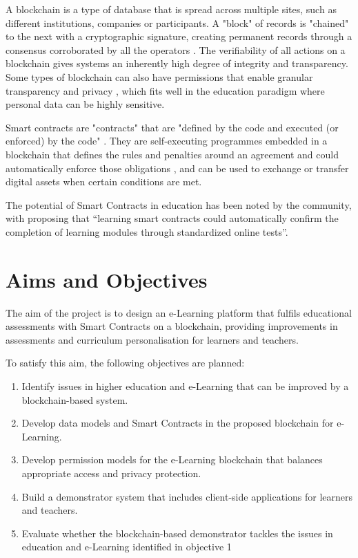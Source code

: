 A blockchain is a type of database that is spread across multiple sites, such as different institutions, companies
or participants. A "block" of records is "chained" to the next with a cryptographic signature, creating permanent records
through a consensus corroborated by all the operators \citep[p.17]{walport2016distributed}.
The verifiability of all actions on a blockchain gives systems an inherently high degree of integrity and transparency.
Some types of blockchain can also have permissions that enable granular transparency and privacy \citep[p.22]{walport2016distributed},
which fits well in the education paradigm where personal data can be highly sensitive.

Smart contracts are "contracts" that are "defined by the code and executed (or enforced) by the code" \citep[p.16]{swan2015blockchain}.
They are self-executing programmes embedded in a blockchain that defines the rules and penalties around an agreement and could automatically enforce
those obligations \citep{gulhane2017ibm}, and can be used to exchange or transfer digital assets when certain conditions are met.

The potential of Smart Contracts in education has been noted by the community, with \citet[p.62]{swan2015blockchain}
proposing that “learning smart contracts could automatically confirm the completion of learning modules through standardized
online tests”.

\section{Aims and Objectives} %

The aim of the project is to design an e-Learning platform that fulfils educational assessments
with Smart Contracts on a blockchain, providing improvements in assessments and curriculum
personalisation for learners and teachers.

To satisfy this aim, the following objectives are planned:
\begin{enumerate}
	\setlength\itemsep{0em}
	\item Identify issues in higher education and e-Learning that can be improved by a blockchain-based system.
	\item Develop data models and Smart Contracts in the proposed blockchain for e-Learning.
	\item Develop permission models for the e-Learning blockchain that balances appropriate access and privacy protection.
	\item Build a demonstrator system that includes client-side applications for learners and teachers.
	\item Evaluate whether the blockchain-based demonstrator tackles the issues in education and e-Learning identified in objective 1
\end{enumerate}

